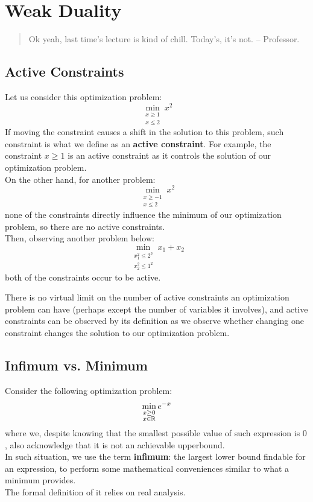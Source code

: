 \chapter{Weak Duality}
\begin{quote}
    Ok yeah, last time's lecture is kind of chill.
    Today's, it's not.
    -- Professor.
\end{quote}

\section{Active Constraints}
Let us consider this optimization problem:
\[
    \min_{\substack{x \geq 1 \\ x \leq 2}} x^2
\]
If moving the constraint causes a shift in the solution to this problem, such constraint is what we define as an \textbf{active constraint}.
For example, the constraint $x \geq 1$ is an active constraint as it controls the solution of our optimization problem. \\
On the other hand, for another problem:
\[
    \min_{\substack{x \geq -1 \\ x \leq 2}} x^2
\]
none of the constraints directly influence the minimum of our optimization problem, so there are no active constraints. \\
Then, observing another problem below:
\[
    \min_{\substack{x_1^2 \leq 2^2 \\ x_2^2 \leq 1^2}} x_1 + x_2
\]
both of the constraints occur to be active.

There is no virtual limit on the number of active constraints an optimization problem can have (perhaps except the number of variables it involves), and active constraints can be observed by its definition as we observe whether changing one constraint changes the solution to our optimization problem.

\section{Infimum vs. Minimum}
Consider the following optimization problem:
\[
    \min_{\substack{x \geq 0 \\ x \in \mathbb{R}}} e^{-x}
\]
where we, despite knowing that the smallest possible value of such expression is $0$, also acknowledge that it is not an achievable upperbound. \\
In such situation, we use the term \textbf{infimum}: the largest lower bound findable for an expression, to perform some mathematical conveniences similar to what a minimum provides. \\
The formal definition of it relies on real analysis.

